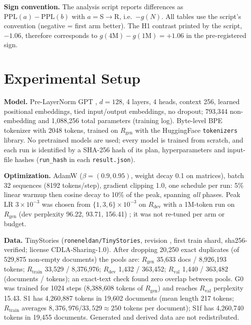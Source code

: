 \documentclass[conference]{IEEEtran}
\newcommand{\SR}{S$\to$R}
\begin{document}
\textbf{Sign convention.} The analysis script reports differences as $\mathrm{PPL}(a)-\mathrm{PPL}(b)$ with $a{=}$\SR, i.e.\ $-g(N)$. All tables use the script's convention (negative = first arm better). The H1 contrast printed by the script, $-1.06$, therefore corresponds to $g(4\text{M})-g(1\text{M})=+1.06$ in the pre-registered sign.

\section{Experimental Setup}
\textbf{Model.} Pre-LayerNorm GPT \cite{vaswani2017attention}, $d{=}128$, 4 layers, 4 heads, context 256, learned positional embeddings, tied input/output embeddings, no dropout; 793,344 non-embedding and 1,088,256 total parameters (training log). Byte-level BPE \cite{sennrich2016bpe} tokenizer with 2048 tokens, trained on $R_{\text{gen}}$ with the HuggingFace \texttt{tokenizers} library. No pretrained models are used; every model is trained from scratch, and each run is identified by a SHA-256 hash of its plan, hyperparameters and input-file hashes (\texttt{run\_hash} in each \texttt{result.json}).

\textbf{Optimization.} AdamW \cite{loshchilov2019adamw} ($\beta{=}(0.9,0.95)$, weight decay 0.1 on matrices), batch 32 sequences (8192 tokens/step), gradient clipping 1.0, one schedule per run: 5\% linear warmup then cosine decay to 10\% of the peak, spanning \emph{all} phases. Peak LR $3\times10^{-3}$ was chosen from $\{1,3,6\}\times10^{-3}$ on $R_{\text{dev}}$ with a 1M-token run on $R_{\text{gen}}$ (dev perplexity 96.22, 93.71, 156.41)%
; it was not re-tuned per arm or budget.

\textbf{Data.} TinyStories \cite{eldan2023tinystories} (\texttt{roneneldan/TinyStories}, revision \texttt{}, first train shard, sha256-verified; license CDLA-Sharing-1.0). After dropping 20,250 exact duplicates (of 529,875 non-empty documents) the pools are: $R_{\text{gen}}$ 35,633 docs / 8,926,193 tokens; $R_{\text{train}}$ 33,529 / 8,376,976; $R_{\text{dev}}$ 1,432 / 363,452; $R_{\text{val}}$ 1,440 / 363,482 (documents / tokens); an exact-text check found zero overlap between pools.%
 G0 was trained for 1024 steps (8,388,608 tokens of $R_{\text{gen}}$) and reaches $R_{\text{val}}$ perplexity 15.43.%
 S1 has 4,260,887 tokens in 19,602 documents (mean length 217 tokens; $R_{\text{train}}$ averages $8{,}376{,}976/33{,}529\approx250$ tokens per document); S1f has 4,260,740 tokens in 19,455 documents.%
 Generated and derived data are not redistributed.
\end{document}
